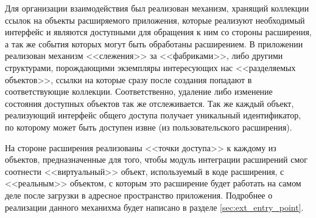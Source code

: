 Для организации взаимодействия был реализован механизм, хранящий коллекции ссылок на объекты расширяемого приложения, которые реализуют необходимый интерфейс и являются доступными для обращения к ним со стороны расширения, а так же события которых могут быть обработаны расширением. В приложении реализован механизм <<слежения>> за <<фабриками>>, либо другими структурами, порождающими экземпляры интересующих нас <<разделяемых объектов>>, ссылки на которые сразу после создания попадают в соответствующие коллекции. Соответственно, удаление либо изменение состояния доступных объектов так же отслеживается. Так же каждый объект, реализующий интерфейс общего доступа получает уникальный идентификатор, по которому может быть доступен извне (из пользовательского расширения).

На стороне расширения реализованы <<точки доступа>> к каждому из объектов, предназначенные для того, чтобы модуль интеграции расширений смог соотнести <<виртуальный>> объект, используемый в коде расширения, с <<реальным>> объектом, с которым это расширение будет работать на самом деле после загрузки в адресное пространство приложения. Подробнее о реализации данного механихма будет написано в разделе \ref{sec:ext_entry_point}.

\pagebreak
